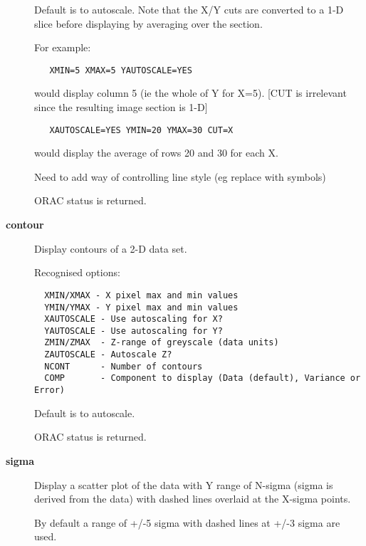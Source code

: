 \begin{description}
Default is to autoscale. Note that the X/Y cuts are converted
to a 1-D slice before displaying by averaging over the section.



For example:

\begin{verbatim}
   XMIN=5 XMAX=5 YAUTOSCALE=YES
\end{verbatim}


would display column 5 (ie the whole of Y for X=5).
[CUT is irrelevant since the resulting image section is 1-D]

\begin{verbatim}
   XAUTOSCALE=YES YMIN=20 YMAX=30 CUT=X
\end{verbatim}


would display the average of rows 20 and 30 for each X.



Need to add way of controlling line style (eg replace with symbols)



ORAC status is returned.

\item[\textbf{contour}] \mbox{}

Display contours of a 2-D data set.



Recognised options:

\begin{verbatim}
  XMIN/XMAX - X pixel max and min values
  YMIN/YMAX - Y pixel max and min values
  XAUTOSCALE - Use autoscaling for X?
  YAUTOSCALE - Use autoscaling for Y?
  ZMIN/ZMAX  - Z-range of greyscale (data units)
  ZAUTOSCALE - Autoscale Z?
  NCONT      - Number of contours
  COMP       - Component to display (Data (default), Variance or Error)
\end{verbatim}


Default is to autoscale.



ORAC status is returned.

\item[\textbf{sigma}] \mbox{}

Display a scatter plot of the data with Y range of N-sigma (sigma
is derived from the data) with dashed lines overlaid at the X-sigma
points.



By default a range of +/-5 sigma with dashed lines at +/-3 sigma
are used.




\end{description}
